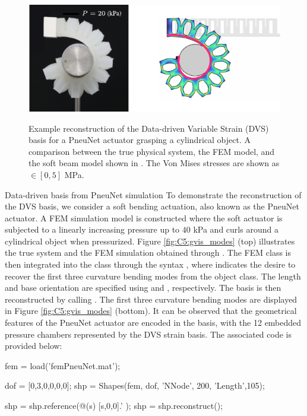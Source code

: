 \begin{figure}[!t]
\centering
\includegraphics*[width=.85\textwidth]{./pdf/thesis-figure-6-11-1.pdf} \\[0.15em]
% 
\caption{Example reconstruction of the Data-driven Variable Strain (DVS) basis for a PneuNet actuator grasping a cylindrical object. A comparison between the true physical system, the FEM model, and the soft beam model shown in . The Von Mises stresses are shown as \protect{}$\!\!\in [0,5]$ \si{\mega \pascal}.}
\vspace{-6mm}
\label{fig:C5:gvis_experiment}
\end{figure}
%
\begin{example}{Data-driven basis from PneuNet simulation}
To demonstrate the reconstruction of the DVS basis, we consider a soft bending actuation, also known as the PneuNet actuator. A FEM simulation model is constructed where the soft actuator is subjected to a linearly increasing pressure up to $40$ \si{\kilo \pascal} and curls around a cylindrical object when pressurized. Figure \ref{fig:C5:gvis_modes} (top) illustrates the true system and the FEM simulation obtained through . The FEM class is then integrated into the  class through the syntax , where  indicates the desire to recover the first three curvature bending modes from the  object class. The length and base orientation are specified using  and , respectively. The basis is then reconstructed by calling . The first three curvature bending modes are displayed in Figure \ref{fig:C5:gvis_modes} (bottom). It can be observed that the geometrical features of the PneuNet actuator are encoded in the basis, with the 12 embedded pressure chambers represented by the DVS strain basis. The associated code is provided below:
\end{example}
%
\begin{matlabcode}
fem = load('femPneuNet.mat');   %

dof = [0,3,0,0,0,0];  %
shp = Shapes(fem, dof, 'NNode', 200, 'Length',105);

shp = shp.reference(@(s) [s,0,0].' );
shp = shp.reconstruct();
\end{matlabcode} 
% 
\\

